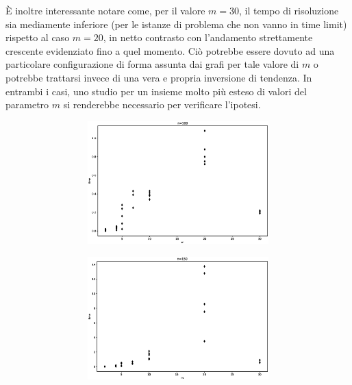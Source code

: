 È inoltre interessante notare come, per il valore $m=30$, il tempo di risoluzione sia mediamente inferiore (per le istanze di problema che non vanno in time limit) rispetto al caso $m=20$, in netto contrasto con l'andamento strettamente crescente evidenziato fino a quel momento. Ciò potrebbe essere dovuto ad una particolare configurazione di forma assunta dai grafi per tale valore di $m$ o potrebbe trattarsi invece di una vera e propria inversione di tendenza. In entrambi i casi, uno studio per un insieme molto più esteso di valori del parametro $m$ si renderebbe necessario per verificare l'ipotesi.

\begin{figure}[h!]
     \centering
     \begin{subfigure}[b]{\textwidth}
     	\centering
	     \begin{subfigure}[b]{0.32\textwidth}
	         \includegraphics[width=\columnwidth]{images/bagm0.eps}
	     \end{subfigure}
	     \hspace{0em}
	     \begin{subfigure}[b]{0.32\textwidth}
	         \includegraphics[width=\columnwidth]{images/bagm1.eps}

\end{subfigure}
\end{subfigure}
\end{figure}
